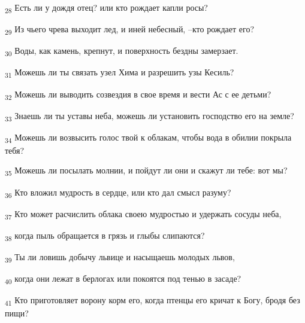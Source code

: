 \begin{tcolorbox}
\textsubscript{28} Есть ли у дождя отец? или кто рождает капли росы?
\end{tcolorbox}
\begin{tcolorbox}
\textsubscript{29} Из чьего чрева выходит лед, и иней небесный, --кто рождает его?
\end{tcolorbox}
\begin{tcolorbox}
\textsubscript{30} Воды, как камень, крепнут, и поверхность бездны замерзает.
\end{tcolorbox}
\begin{tcolorbox}
\textsubscript{31} Можешь ли ты связать узел Хима и разрешить узы Кесиль?
\end{tcolorbox}
\begin{tcolorbox}
\textsubscript{32} Можешь ли выводить созвездия в свое время и вести Ас с ее детьми?
\end{tcolorbox}
\begin{tcolorbox}
\textsubscript{33} Знаешь ли ты уставы неба, можешь ли установить господство его на земле?
\end{tcolorbox}
\begin{tcolorbox}
\textsubscript{34} Можешь ли возвысить голос твой к облакам, чтобы вода в обилии покрыла тебя?
\end{tcolorbox}
\begin{tcolorbox}
\textsubscript{35} Можешь ли посылать молнии, и пойдут ли они и скажут ли тебе: вот мы?
\end{tcolorbox}
\begin{tcolorbox}
\textsubscript{36} Кто вложил мудрость в сердце, или кто дал смысл разуму?
\end{tcolorbox}
\begin{tcolorbox}
\textsubscript{37} Кто может расчислить облака своею мудростью и удержать сосуды неба,
\end{tcolorbox}
\begin{tcolorbox}
\textsubscript{38} когда пыль обращается в грязь и глыбы слипаются?
\end{tcolorbox}
\begin{tcolorbox}
\textsubscript{39} Ты ли ловишь добычу львице и насыщаешь молодых львов,
\end{tcolorbox}
\begin{tcolorbox}
\textsubscript{40} когда они лежат в берлогах или покоятся под тенью в засаде?
\end{tcolorbox}
\begin{tcolorbox}
\textsubscript{41} Кто приготовляет ворону корм его, когда птенцы его кричат к Богу, бродя без пищи?
\end{tcolorbox}
